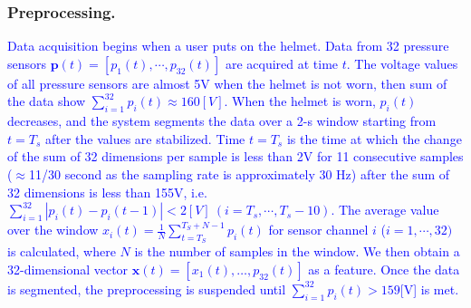 \documentclass[sigchi,authordraft]{acmart}
\begin{document}
\subsubsection{Preprocessing.}
\textcolor{blue}{Data acquisition begins when a user puts on the helmet. Data from 32 pressure sensors $\bm{p}(t)=[p_1(t),\cdots,p_{32}(t)]$ are acquired at time $t$. The voltage values of all pressure sensors are almost 5V when the helmet is not worn, then sum of the data show $\sum_{i=1}^{32}p_i(t)\approx160[V]$. When the helmet is worn, $p_i(t)$ decreases, and the system segments the data over a 2-s window starting from $t=T_s$ after the values are stabilized. Time $t=T_s$ is the time at which the change of the sum of 32 dimensions per sample is less than 2V for 11 consecutive samples ($\approx$11/30 second as the sampling rate is approximately 30 Hz) after the sum of 32 dimensions is less than 155V, i.e. $\sum_{i=1}^{32}|p_i(t)-p_i(t-1)|<2[V]~(i=T_s,\cdots,T_s-10)$. The average value over the window $x_i(t)=\frac{1}{N}\sum_{t=T_S}^{T_S+N-1}p_i(t)$ for sensor channel $i$ ($i=1,\cdots,32)$ is calculated, where $N$ is the number of samples in the window. We then obtain a 32-dimensional vector $\bm{x}(t)=[x_{1}(t),\dots,p_{32}(t)]$ as a feature. Once the data is segmented, the preprocessing is suspended until $\sum_{i=1}^{32}p_i(t)>159$[V] is met.}




\end{document}
